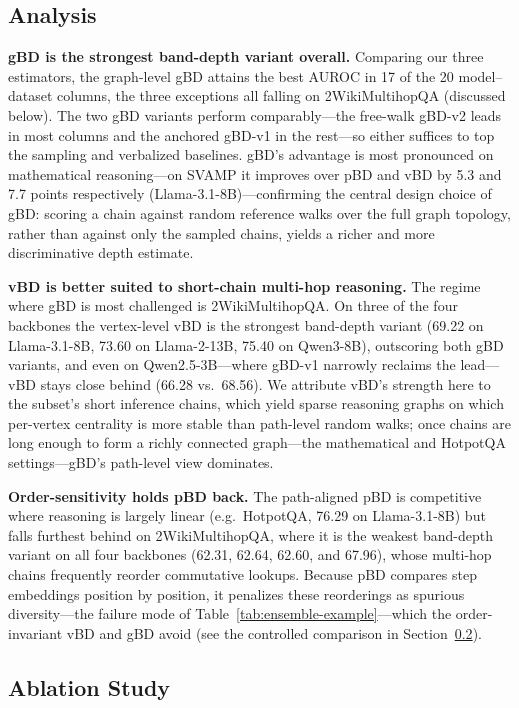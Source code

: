 \documentclass[letterpaper]{article} %
\begin{document}
\subsection{Analysis}
\label{sec:exp:analysis}

\textbf{gBD is the strongest band-depth variant overall.} Comparing our three
estimators, the graph-level gBD attains the best AUROC in 17 of the 20
model--dataset columns, the three exceptions all falling on 2WikiMultihopQA
(discussed below). The two gBD variants perform comparably---the free-walk gBD-v2
leads in most columns and the anchored gBD-v1 in the rest---so either suffices to
top the sampling and verbalized baselines. gBD's advantage is most pronounced on
mathematical reasoning---on SVAMP it improves over pBD and vBD by 5.3 and 7.7
points respectively (Llama-3.1-8B)---confirming the central design choice of gBD:
scoring a chain against random reference walks over the full graph topology,
rather than against only the sampled chains, yields a richer and more
discriminative depth estimate.

\textbf{vBD is better suited to short-chain multi-hop reasoning.} The regime where
gBD is most challenged is 2WikiMultihopQA. On three of the four backbones the
vertex-level vBD is the strongest band-depth variant (69.22 on Llama-3.1-8B, 73.60
on Llama-2-13B, 75.40 on Qwen3-8B), outscoring both gBD variants, and even on
Qwen2.5-3B---where
gBD-v1 narrowly reclaims the lead---vBD stays close behind (66.28 vs.\ 68.56). We
attribute vBD's strength here to the subset's short inference chains, which yield
sparse reasoning graphs on which per-vertex centrality is more stable than
path-level random walks; once chains are long enough to form a richly connected
graph---the mathematical and HotpotQA settings---gBD's path-level view dominates.

\textbf{Order-sensitivity holds pBD back.} The path-aligned pBD is competitive
where reasoning is largely linear (e.g.\ HotpotQA, 76.29 on Llama-3.1-8B) but
falls furthest behind on 2WikiMultihopQA, where it is the weakest band-depth
variant on all four backbones (62.31, 62.64, 62.60, and 67.96), whose multi-hop
chains frequently reorder commutative lookups. Because pBD compares step
embeddings position by position, it penalizes these reorderings as spurious
diversity---the failure mode of Table~\ref{tab:ensemble-example}---which the
order-invariant vBD and gBD avoid (see the controlled comparison in
Section~\ref{sec:exp:ablation}).

\subsection{Ablation Study}
\label{sec:exp:ablation}
\end{document}
